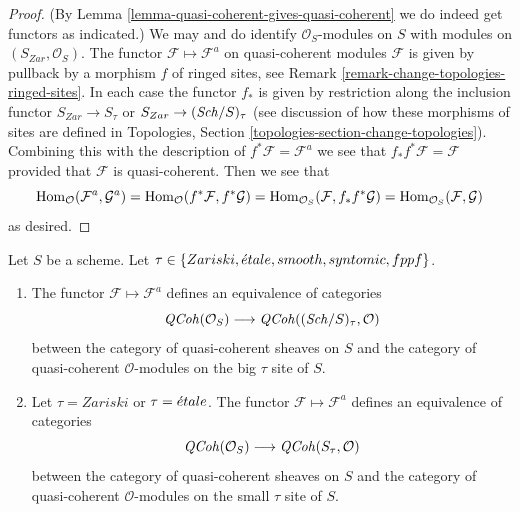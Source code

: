 \begin{proof}
(By Lemma \ref{lemma-quasi-coherent-gives-quasi-coherent} we do
indeed get functors as indicated.)
We may and do identify $\mathcal{O}_S$-modules on $S$ with
modules on $(S_{Zar}, \mathcal{O}_S)$.
The functor $\mathcal{F} \mapsto \mathcal{F}^a$ on quasi-coherent modules
$\mathcal{F}$ is given by pullback by a morphism $f$
of ringed sites, see Remark \ref{remark-change-topologies-ringed-sites}.
In each case the functor $f_*$ is given by restriction
along the inclusion functor $S_{Zar} \to S_\tau$ or
$S_{Zar} \to (\mathit{Sch}/S)_\tau$ (see discussion of how
these morphisms of sites are defined in Topologies, Section
\ref{topologies-section-change-topologies}).
Combining this with the description of $f^*\mathcal{F} = \mathcal{F}^a$
we see that $f_*f^*\mathcal{F} = \mathcal{F}$ provided that
$\mathcal{F}$ is quasi-coherent. Then we see that
$$
\mathop{\mathrm{Hom}}\nolimits_\mathcal{O}(\mathcal{F}^a, \mathcal{G}^a) =
\mathop{\mathrm{Hom}}\nolimits_\mathcal{O}(f^*\mathcal{F}, f^*\mathcal{G}) =
\mathop{\mathrm{Hom}}\nolimits_{\mathcal{O}_S}(\mathcal{F}, f_*f^*\mathcal{G}) =
\mathop{\mathrm{Hom}}\nolimits_{\mathcal{O}_S}(\mathcal{F}, \mathcal{G})
$$
as desired.
\end{proof}

\begin{proposition}
\label{proposition-equivalence-quasi-coherent}
Let $S$ be a scheme.
Let $\tau \in \{Zariski, \linebreak[0] \etale, \linebreak[0]
smooth, \linebreak[0] syntomic, \linebreak[0] fppf\}$.
\begin{enumerate}
\item The functor $\mathcal{F} \mapsto \mathcal{F}^a$
defines an equivalence of categories
$$
\mathit{QCoh}(\mathcal{O}_S)
\longrightarrow
\mathit{QCoh}((\mathit{Sch}/S)_\tau, \mathcal{O})
$$
between the category of quasi-coherent sheaves on $S$ and the category
of quasi-coherent $\mathcal{O}$-modules on the big $\tau$ site of $S$.
\item Let $\tau = Zariski$ or $\tau = {\acute{e}tale}$.
The functor $\mathcal{F} \mapsto \mathcal{F}^a$
defines an equivalence of categories
$$
\mathit{QCoh}(\mathcal{O}_S)
\longrightarrow
\mathit{QCoh}(S_\tau, \mathcal{O})
$$
between the category of quasi-coherent sheaves on $S$ and the category
of quasi-coherent $\mathcal{O}$-modules on the small $\tau$ site of $S$.
\end{enumerate}
\end{proposition}

